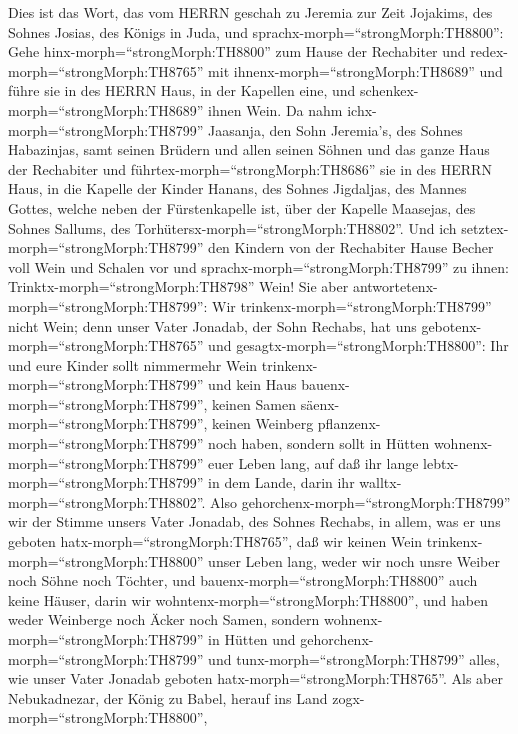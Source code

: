  Dies ist das Wort, das vom HERRN geschah zu Jeremia zur
Zeit Jojakims, des Sohnes Josias, des Königs in Juda, und
sprachx-morph=``strongMorph:TH8800'':  Gehe
hinx-morph=``strongMorph:TH8800'' zum Hause der Rechabiter und
redex-morph=``strongMorph:TH8765'' mit
ihnenx-morph=``strongMorph:TH8689'' und führe sie in des HERRN Haus, in
der Kapellen eine, und schenkex-morph=``strongMorph:TH8689'' ihnen Wein.
 Da nahm ichx-morph=``strongMorph:TH8799'' Jaasanja, den
Sohn Jeremia's, des Sohnes Habazinjas, samt seinen Brüdern und allen
seinen Söhnen und das ganze Haus der Rechabiter  und
führtex-morph=``strongMorph:TH8686'' sie in des HERRN Haus, in die
Kapelle der Kinder Hanans, des Sohnes Jigdaljas, des Mannes Gottes,
welche neben der Fürstenkapelle ist, über der Kapelle Maasejas, des
Sohnes Sallums, des Torhütersx-morph=``strongMorph:TH8802''.
 Und ich setztex-morph=``strongMorph:TH8799'' den Kindern
von der Rechabiter Hause Becher voll Wein und Schalen vor und
sprachx-morph=``strongMorph:TH8799'' zu ihnen:
Trinktx-morph=``strongMorph:TH8798'' Wein!  Sie aber
antwortetenx-morph=``strongMorph:TH8799'': Wir
trinkenx-morph=``strongMorph:TH8799'' nicht Wein; denn unser Vater
Jonadab, der Sohn Rechabs, hat uns gebotenx-morph=``strongMorph:TH8765''
und gesagtx-morph=``strongMorph:TH8800'': Ihr und eure Kinder sollt
nimmermehr Wein trinkenx-morph=``strongMorph:TH8799''  und
kein Haus bauenx-morph=``strongMorph:TH8799'', keinen Samen
säenx-morph=``strongMorph:TH8799'', keinen Weinberg
pflanzenx-morph=``strongMorph:TH8799'' noch haben, sondern sollt in
Hütten wohnenx-morph=``strongMorph:TH8799'' euer Leben lang, auf daß ihr
lange lebtx-morph=``strongMorph:TH8799'' in dem Lande, darin ihr
walltx-morph=``strongMorph:TH8802''.  Also
gehorchenx-morph=``strongMorph:TH8799'' wir der Stimme unsers Vater
Jonadab, des Sohnes Rechabs, in allem, was er uns geboten
hatx-morph=``strongMorph:TH8765'', daß wir keinen Wein
trinkenx-morph=``strongMorph:TH8800'' unser Leben lang, weder wir noch
unsre Weiber noch Söhne noch Töchter,  und
bauenx-morph=``strongMorph:TH8800'' auch keine Häuser, darin wir
wohntenx-morph=``strongMorph:TH8800'', und haben weder Weinberge noch
Äcker noch Samen,  sondern
wohnenx-morph=``strongMorph:TH8799'' in Hütten und
gehorchenx-morph=``strongMorph:TH8799'' und
tunx-morph=``strongMorph:TH8799'' alles, wie unser Vater Jonadab geboten
hatx-morph=``strongMorph:TH8765''.  Als aber Nebukadnezar,
der König zu Babel, herauf ins Land zogx-morph=``strongMorph:TH8800'',
